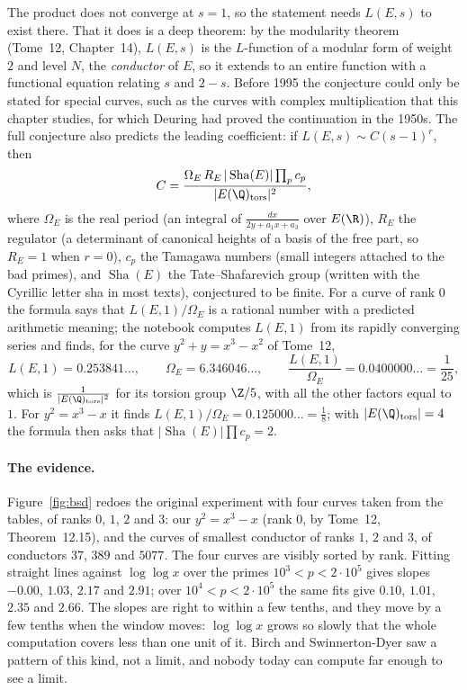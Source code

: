The product does not converge at $s=1$, so the statement needs $L(E,s)$ to exist there. That it does is a deep theorem: by the modularity theorem
(Tome~12, Chapter~14), $L(E,s)$ is the $L$-function of a modular form of weight $2$ and level $N$, the \emph{conductor} of $E$, so it extends to an entire
function with a functional equation relating $s$ and $2-s$. Before 1995 the conjecture could only be stated for special curves, such as the curves with
complex multiplication that this chapter studies, for which Deuring had proved the continuation in the 1950s. The full conjecture also predicts the leading
coefficient: if $L(E,s)\sim C(s-1)^r$, then
\[
C=\frac{\Omega_E\,R_E\,|\operatorname{Sha}(E)|\prod_pc_p}{|E(\Q)_{\mathrm{tors}}|^2},
\]
where $\Omega_E$ is the real period (an integral of $\frac{dx}{2y+a_1x+a_3}$ over $E(\R)$), $R_E$ the regulator (a determinant of canonical heights of a basis
of the free part, so $R_E=1$ when $r=0$), $c_p$ the Tamagawa numbers (small integers attached to the bad primes), and $\operatorname{Sha}(E)$ the Tate--Shafarevich group (written with the Cyrillic letter sha in most texts),
conjectured to be finite. For a curve of rank $0$ the formula says that $L(E,1)/\Omega_E$ is a rational number with a predicted arithmetic meaning; the
notebook computes $L(E,1)$ from its rapidly converging series and finds, for the curve $y^2+y=x^3-x^2$ of Tome~12,
\[
L(E,1)=0.253841\ldots,\qquad\Omega_E=6.346046\ldots,\qquad\frac{L(E,1)}{\Omega_E}=0.0400000\ldots=\frac1{25},
\]
which is $\frac1{|E(\Q)_{\mathrm{tors}}|^2}$ for its torsion group $\Z/5$, with all the other factors equal to $1$. For $y^2=x^3-x$ it finds
$L(E,1)/\Omega_E=0.125000\ldots=\frac18$; with $|E(\Q)_{\mathrm{tors}}|=4$ the formula then asks that $|\operatorname{Sha}(E)|\prod c_p=2$.

\paragraph{The evidence.} Figure~\ref{fig:bsd} redoes the original experiment with four curves taken from the tables, of ranks $0$, $1$, $2$ and $3$: our
$y^2=x^3-x$ (rank $0$, by Tome~12, Theorem~12.15), and the curves of smallest conductor of ranks $1$, $2$ and $3$, of conductors $37$, $389$ and $5077$. The
four curves are visibly sorted by rank. Fitting straight lines against $\log\log x$ over the primes $10^3<p<2\cdot10^5$ gives slopes $-0.00$, $1.03$,
$2.17$ and $2.91$; over $10^4<p<2\cdot10^5$ the same fits give $0.10$, $1.01$, $2.35$ and $2.66$. The slopes are right to within a few tenths, and they move
by a few tenths when the window moves: $\log\log x$ grows so slowly that the whole computation covers less than one unit of it. Birch and Swinnerton-Dyer
saw a pattern of this kind, not a limit, and nobody today can compute far enough to see a limit.

